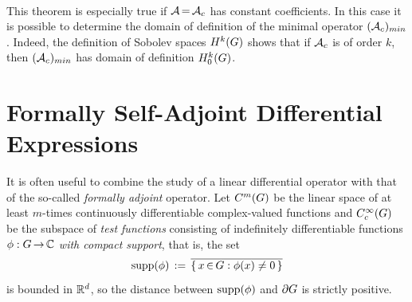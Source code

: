 \documentclass[11pt,twoside]{article}
\begin{document}
\paragraph*{}
This theorem is especially true
if ${\mathcal{A}} {\,=\,} {\mathcal{A}}_c$ has constant coefficients.
In this case it is possible to determine
the domain of definition of the minimal operator $({\mathcal{A}}_c)_{min}$.
Indeed,
the definition of Sobolev spaces $H^k(G)$ shows
that if ${\mathcal{A}}_c$ is of order $k$,
then $({\mathcal{A}}_c)_{min}$ has domain of definition $H_0^{k}(G)$.

\section{Formally Self-Adjoint Differential Expressions}
It is often useful to combine the study of a linear differential operator
with that of the so-called \textit{formally adjoint} operator.
Let $C^m(G)$ be the linear space
of at least $m$-times continuously differentiable complex-valued functions
and $C_c^{\infty}(G)$ be the subspace of \textit{test functions}
consisting of indefinitely differentiable functions
$\phi:G {\,\to\,} {\mathbb{C}}$ \textit{with compact support},
that is,
the set
\[\operatorname{supp}(\phi) \,:=\, \overline{\{\,x {\,\in\,} G: \phi(x) \neq 0\,\} }\]
is bounded in ${\mathbb{R}}^d$,
so the distance between $\operatorname{supp}(\phi)$ and $\partial G$ is strictly positive.
\end{document}
